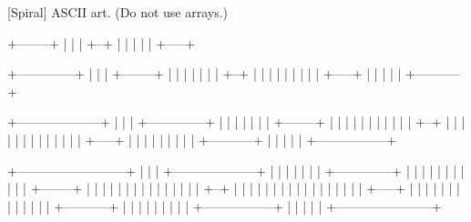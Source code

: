 [Spiral]
ASCII art.
(Do not use arrays.)
\begin{console}[commandchars=\\\{\}]
+--------+
|        |
|  +--+  |
|  |     |
|  +-----+
\end{console}
\begin{console}[commandchars=\\\{\}]
+--------------+
|              |
|  +--------+  |
|  |        |  |
|  |  +--+  |  |
|  |  |     |  |
|  |  +-----+  |
|  |           |
|  +-----------+
\end{console}
\begin{console}[commandchars=\\\{\}]
+--------------------+
|                    |
|  +--------------+  |
|  |              |  |
|  |  +--------+  |  |
|  |  |        |  |  |
|  |  |  +--+  |  |  |
|  |  |  |     |  |  |
|  |  |  +-----+  |  |
|  |  |           |  |
|  |  +-----------+  |
|  |                 |
|  +-----------------+
\end{console}
\begin{console}[commandchars=\\\{\}]
+--------------------------+
|                          |
|  +--------------------+  |
|  |                    |  |
|  |  +--------------+  |  |
|  |  |              |  |  |
|  |  |  +--------+  |  |  |
|  |  |  |        |  |  |  |
|  |  |  |  +--+  |  |  |  |
|  |  |  |  |     |  |  |  |
|  |  |  |  +-----+  |  |  |
|  |  |  |           |  |  |
|  |  |  +-----------+  |  |
|  |  |                 |  |
|  |  +-----------------+  |
|  |                       |
|  +-----------------------+
\end{console}
